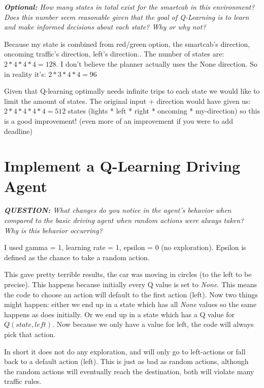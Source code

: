 \documentclass[11pt]{article}
\begin{document}
\begin{center}
\textit{\textbf{Optional:} How many states in total exist for the smartcab in this environment? Does this number seem reasonable given that the goal of Q-Learning is to learn and make informed decisions about each state? Why or why not?}
\end{center} 
Because my state is combined from red/green option, the smartcab's direction, oncoming traffic's direction, left's direction.. The number of states are: $2 * 4 * 4 * 4 = 128$. I don't believe the planner actually uses the None direction. So in reality it's: $ 2 * 3 * 4 * 4  = 96$

Given that Q-learning optimally needs infinite trips to each state we would like to limit the amount of states. The original input + direction would have given us: $ 2 * 4 * 4 * 4 * 4 = 512 $ states (lights * left * right * oncoming * my-direction) so this is a good improvement! (even more of an improvement if you were to add deadline)

\section{Implement a Q-Learning Driving Agent}
\begin{center}
\textit{\textbf{QUESTION:} What changes do you notice in the agent's behavior when compared to the basic driving agent when random actions were always taken? Why is this behavior occurring?}
\end{center}
I used gamma = 1, learning rate = 1, epsilon = 0 (no exploration). Epsilon is defined as the chance to take a random action.\par
This gave pretty terrible results, the car was moving in circles (to the left to be precise). This happens because initially every Q value is set to \textit{None}. This means the code to choose an action will default to the first action (left). Now two things might happen: either we end up in a state which has all \textit{None} values so the same happens as does initially. Or we end up in a state which has a Q value for $Q(state, left)$. Now because we only have a value for left, the code will always pick that action.\par
In short it does not do any exploration, and will only go to left-actions or fall back to a default action (left). This is just as bad as random actions, although the random actions will eventually reach the destination, both will violate many traffic rules.
\end{document}
